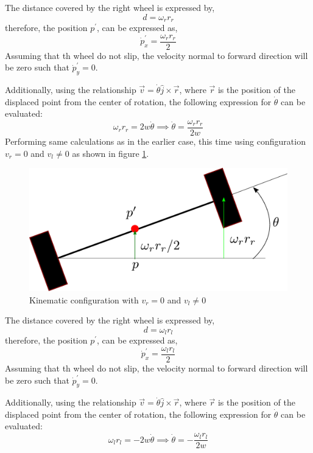 The distance covered by the right wheel is expressed by,
\begin{equation}
	d = \omega_{r} r_{r}
\end{equation}
therefore, the position $p^{\prime}$, can be expressed as,
\begin{equation} \label{eq_2_ch_3_DDR_VR}
\dot{p}^{\prime}_{x} = \frac{\omega_{r} r_{r}}{2}
\end{equation}
Assuming that th wheel do not slip, the velocity normal to forward direction will be zero such that $\dot{p}^{\prime}_{y} = 0$.

Additionally, using the relationship $\vec{v} = \dot{\theta} \hat{j} \times \vec{r}$, where $\vec{r}$ is the position of the displaced point from the center of rotation, the following expression for $\dot{\theta}$ can be evaluated:
\begin{equation} \label{Eq_2_ch_3_DDR_omegaR}
	\omega_{r} r_{r} = 2w \dot{\theta} \implies \dot{\theta} = \frac{\omega_{r} r_{r}}{2w}
\end{equation}
Performing same calculations as in the earlier case, this time using configuration $v_r = 0$ and $v_l \neq 0$ as shown in figure \ref{fig_2_ch_3_KD_DR_2}.
\begin{figure}[h!]
	\centering
	\includegraphics[width=0.4\linewidth]{Bilder/30_DifferentialRobot2.pdf}
	\caption{Kinematic configuration with $v_r = 0$ and $v_l \neq 0$}
	\label{fig_2_ch_3_KD_DR_2}
\end{figure}
The distance covered by the right wheel is expressed by,
\begin{equation}
d = \omega_{l} r_{l}
\end{equation}
therefore, the position $p^{\prime}$, can be expressed as,
\begin{equation} \label{eq_2_ch_3_DDR_VL}
\dot{p}^{\prime}_{x} = \frac{\omega_{l} r_{l}}{2}
\end{equation}
Assuming that th wheel do not slip, the velocity normal to forward direction will be zero such that $\dot{p}^{\prime}_{y} = 0$.

Additionally, using the relationship $\vec{v} = \dot{\theta} \hat{j} \times \vec{r}$, where $\vec{r}$ is the position of the displaced point from the center of rotation, the following expression for $\dot{\theta}$ can be evaluated:
\begin{equation} \label{Eq_2_ch_3_DDR_omegaL}
\omega_{l} r_{l} = - 2w \dot{\theta} \implies \dot{\theta} = - \frac{\omega_{l} r_{l}}{2w}
\end{equation}

